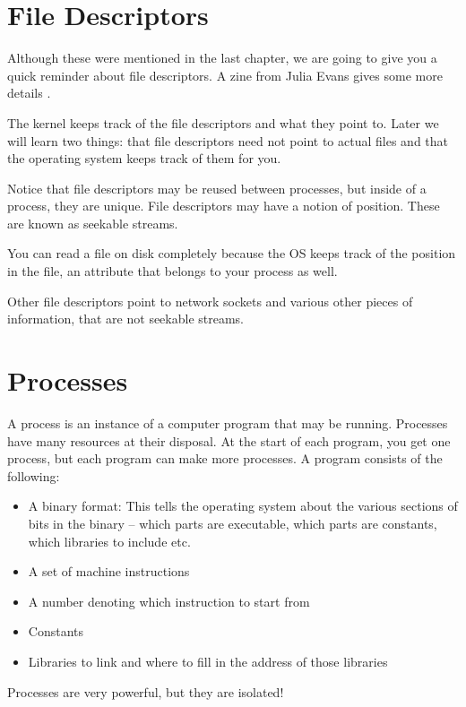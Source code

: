 \section{File Descriptors}

Although these were mentioned in the last chapter, we are going to give you a quick reminder about file descriptors.
A zine from Julia Evans gives some more details \cite{evans_2018}.

The kernel keeps track of the file descriptors and what they point to.
Later we will learn two things: that file descriptors need not point to actual files and that the operating system keeps track of them for you.

Notice that file descriptors may be reused between processes, but inside of a process, they are unique.
File descriptors may have a notion of position. These are known as seekable streams.

You can read a file on disk completely because the OS keeps track of the position in the file, an attribute that belongs to your process as well.

Other file descriptors point to network sockets and various other pieces of information, that are not seekable streams.

\section{Processes}

A process is an instance of a computer program that may be running.
Processes have many resources at their disposal.
At the start of each program, you get one process, but each program can make more processes.
A program consists of the following:

\begin{itemize}
    \item A binary format: This tells the operating system about the various sections of bits in the binary -- which parts are executable, which parts are constants, which libraries to include etc.
    \item A set of machine instructions
    \item A number denoting which instruction to start from
    \item Constants
    \item Libraries to link and where to fill in the address of those libraries
\end{itemize}

Processes are very powerful, but they are isolated!

